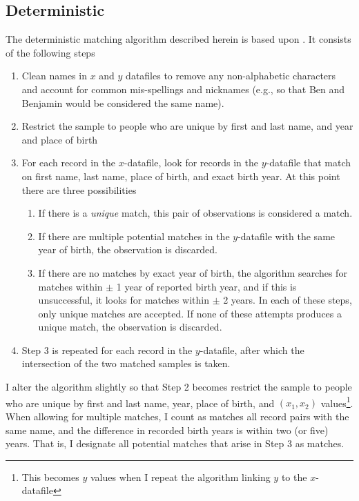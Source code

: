 \documentclass[12pt]{article}
\begin{document}
\subsection{Deterministic}
The deterministic matching algorithm described herein is based upon \cite{abe2012}.  It consists of the following steps
\begin{enumerate}
\item Clean names in $x$ and $y$ datafiles to remove any non-alphabetic characters and account for common mis-spellings and nicknames (e.g., so that Ben and Benjamin would be considered the same name). 
\item Restrict the sample to people who are unique by first and last name, and year and place of birth  %
\item For each record in the $x$-datafile, look for records in the $y$-datafile that match on first name, last name, place of birth, and exact birth year.  At this point there are three possibilities 
\begin{enumerate}
\item If there is a \textit{unique} match, this pair of observations is considered a match.
\item If there are multiple potential matches in the $y$-datafile with the same year of birth, the observation is discarded. 
\item If there are no matches by exact year of birth, the algorithm searches for matches within $\pm$ 1 year of reported birth year, and if this is unsuccessful, it looks for matches within $\pm$ 2 years.  In each of these steps, only unique matches are accepted.  If none of these attempts produces a unique match, the observation is discarded.
\end{enumerate}
\item Step 3 is repeated for each record in the $y$-datafile, after which the intersection of the two matched samples is taken. 
\end{enumerate}

I alter the algorithm slightly so that Step 2 becomes restrict the sample to people who are unique by first and last name, year, place of birth, and $(x_1, x_2)$ values\footnote{This becomes $y$ values when I repeat the algorithm linking $y$ to the $x$-datafile}.  When allowing for multiple matches, I count as matches all record pairs with the same name, and the difference in recorded birth years is within two (or five) years.  That is, I designate all potential matches that arise in Step 3 as matches. 
\end{document}

